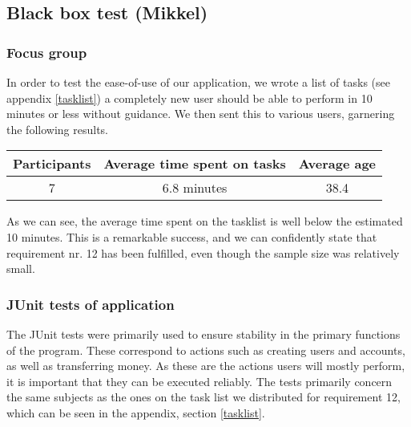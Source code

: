 \subsection{Black box test (Mikkel)}

 
\subsubsection{Focus group}
In order to test the ease-of-use of our application, we wrote a list of tasks (see appendix \ref{tasklist}) a completely new user should be able to perform in 10 minutes or less without guidance. We then sent this to various users, garnering the following results.

\begin{table}[H]
    \centering
    \begin{tabular}{|c|c|c|} \hline 
        \textbf{Participants} & \textbf{Average time spent on tasks} & \textbf{Average age}\\ \hline
        7 & 6.8 minutes & 38.4 \\ \hline
    \end{tabular}
    \label{tab:focus_test_results}
\end{table}

As we can see, the average time spent on the tasklist is well below the estimated 10 minutes. This is a remarkable success, and we can confidently state that requirement nr. 12 has been fulfilled, even though the sample size was relatively small. 
 
\subsubsection{JUnit tests of application}
The JUnit tests were primarily used to ensure stability in the primary functions of the program. These correspond to actions such as creating users and accounts, as well as transferring money. As these are the actions users will mostly perform, it is important that they can be executed reliably. The tests primarily concern the same subjects as the ones on the task list we distributed for requirement 12, which can be seen in the appendix, section \ref{tasklist}.  

